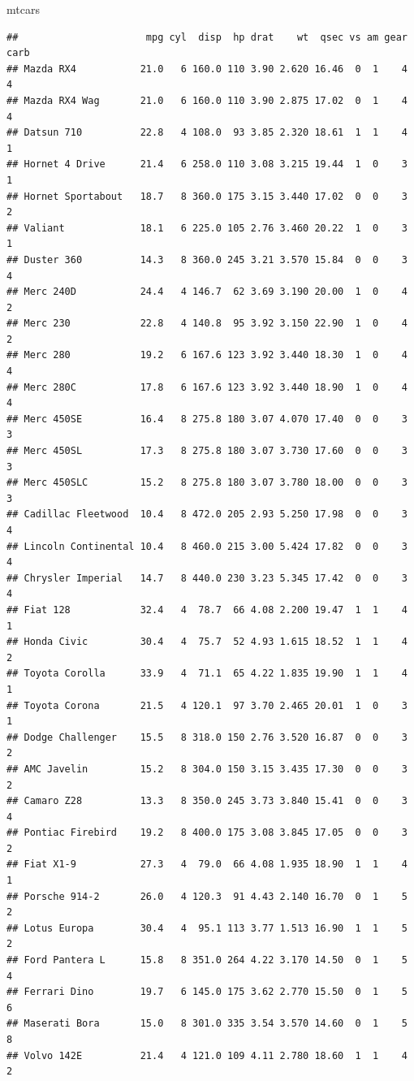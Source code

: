 \documentclass[
]{book}
\newenvironment{Shaded}{\begin{snugshade}}{\end{snugshade}}
\newcommand{\NormalTok}[1]{#1}
\theoremstyle{definition}
\theoremstyle{definition}
\theoremstyle{definition}
\theoremstyle{remark}
\begin{document}
\begin{Shaded}
\begin{Highlighting}[]
\NormalTok{mtcars}
\end{Highlighting}
\end{Shaded}

\begin{verbatim}
##                      mpg cyl  disp  hp drat    wt  qsec vs am gear carb
## Mazda RX4           21.0   6 160.0 110 3.90 2.620 16.46  0  1    4    4
## Mazda RX4 Wag       21.0   6 160.0 110 3.90 2.875 17.02  0  1    4    4
## Datsun 710          22.8   4 108.0  93 3.85 2.320 18.61  1  1    4    1
## Hornet 4 Drive      21.4   6 258.0 110 3.08 3.215 19.44  1  0    3    1
## Hornet Sportabout   18.7   8 360.0 175 3.15 3.440 17.02  0  0    3    2
## Valiant             18.1   6 225.0 105 2.76 3.460 20.22  1  0    3    1
## Duster 360          14.3   8 360.0 245 3.21 3.570 15.84  0  0    3    4
## Merc 240D           24.4   4 146.7  62 3.69 3.190 20.00  1  0    4    2
## Merc 230            22.8   4 140.8  95 3.92 3.150 22.90  1  0    4    2
## Merc 280            19.2   6 167.6 123 3.92 3.440 18.30  1  0    4    4
## Merc 280C           17.8   6 167.6 123 3.92 3.440 18.90  1  0    4    4
## Merc 450SE          16.4   8 275.8 180 3.07 4.070 17.40  0  0    3    3
## Merc 450SL          17.3   8 275.8 180 3.07 3.730 17.60  0  0    3    3
## Merc 450SLC         15.2   8 275.8 180 3.07 3.780 18.00  0  0    3    3
## Cadillac Fleetwood  10.4   8 472.0 205 2.93 5.250 17.98  0  0    3    4
## Lincoln Continental 10.4   8 460.0 215 3.00 5.424 17.82  0  0    3    4
## Chrysler Imperial   14.7   8 440.0 230 3.23 5.345 17.42  0  0    3    4
## Fiat 128            32.4   4  78.7  66 4.08 2.200 19.47  1  1    4    1
## Honda Civic         30.4   4  75.7  52 4.93 1.615 18.52  1  1    4    2
## Toyota Corolla      33.9   4  71.1  65 4.22 1.835 19.90  1  1    4    1
## Toyota Corona       21.5   4 120.1  97 3.70 2.465 20.01  1  0    3    1
## Dodge Challenger    15.5   8 318.0 150 2.76 3.520 16.87  0  0    3    2
## AMC Javelin         15.2   8 304.0 150 3.15 3.435 17.30  0  0    3    2
## Camaro Z28          13.3   8 350.0 245 3.73 3.840 15.41  0  0    3    4
## Pontiac Firebird    19.2   8 400.0 175 3.08 3.845 17.05  0  0    3    2
## Fiat X1-9           27.3   4  79.0  66 4.08 1.935 18.90  1  1    4    1
## Porsche 914-2       26.0   4 120.3  91 4.43 2.140 16.70  0  1    5    2
## Lotus Europa        30.4   4  95.1 113 3.77 1.513 16.90  1  1    5    2
## Ford Pantera L      15.8   8 351.0 264 4.22 3.170 14.50  0  1    5    4
## Ferrari Dino        19.7   6 145.0 175 3.62 2.770 15.50  0  1    5    6
## Maserati Bora       15.0   8 301.0 335 3.54 3.570 14.60  0  1    5    8
## Volvo 142E          21.4   4 121.0 109 4.11 2.780 18.60  1  1    4    2
\end{verbatim}
\end{document}

